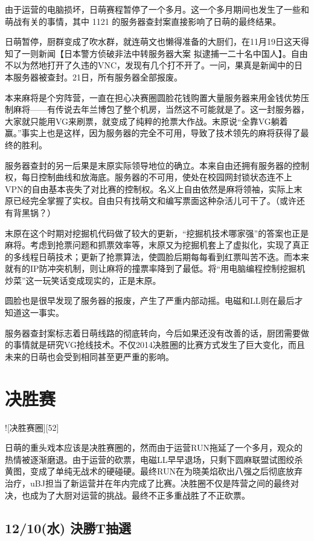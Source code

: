 由于运营的电脑损坏，日萌赛程暂停了一个多月。这一个多月期间也发生了一些和萌战有关的事情，其中 1121 的服务器查封案直接影响了日萌的最终结果。

日萌暂停，厨群变成了吹水群，就连萌文也懒得准备的大厨们，在11月19日这天得知了一则新闻【日本警方侦破非法中转服务器大案 拟逮捕一二十名中国人】。自由不以为然地打开了久违的VNC，发现有几个打不开了。一问，果真是新闻中的日本服务器被查封。21日，所有服务器全部报废。

本来麻将是个穷阵营，一直在担心决赛圈圆脸花钱购置大量服务器来用金钱优势压制麻将——有传说去年兰博包了整个机房，当然这不可能就是了。这一封服务器，大家就只能用VG来刷票，就变成了纯粹的抢票大作战。末原说“全靠VG躺着赢。”事实上也是这样，因为服务器的完全不可用，导致了技术领先的麻将获得了最终的胜利。

服务器查封的另一后果是末原实际领导地位的确立。本来自由还拥有服务器的控制权，每日控制曲线和放海底。服务器的不可用，使处在校园网封锁状态连不上VPN的自由基本丧失了对比赛的控制权。名义上自由依然是麻将领袖，实际上末原已经完全掌握了实权。自由只有找萌文和编写票面这种杂活儿可干了。（或许还有背黑锅？）

末原在这个时期对挖掘机代码做了较大的更新，“挖掘机技术哪家强”的答案也正是麻将。考虑到抢票问题和抓票效率等，末原又为挖掘机套上了虚拟化，实现了真正的多线程日萌技术；更新了抢票算法，使圆脸后期每每看到红票叫苦不迭。而本来就有的IP防冲突机制，则让麻将的撞票率降到了最低。将“用电脑编程控制挖掘机炒菜”这一玩笑话变成现实的，正是末原。

圆脸也是很早发现了服务器的报废，产生了严重内部动摇。电磁和LL则在最后才知道这一事实。

服务器查封案标志着日萌线路的彻底转向，今后如果还没有改善的话，厨团需要做的事情就是研究VG抢线技术。不仅2014决胜圈的比赛方式发生了巨大变化，而且未来的日萌也会受到相同甚至更严重的影响。

\section{决胜赛}

![决胜赛圈][52]

日萌的重头戏本应该是决胜赛圈的，然而由于运营RUN拖延了一个多月，观众的热情被逐渐磨退。由于运营的砍票，电磁LL早早退场，只剩下圆麻联盟试图绞杀黄图，变成了单纯无战术的硬碰硬。最终RUN在为晓美焰砍出八强之后彻底放弃治疗，uBJ担当了新运营并在年内完成了比赛。决胜圈不仅是阵营之间的最终对决，也成为了大厨对运营的挑战。最终不正多重战胜了不正砍票。

\subsection{12/10(水) 決勝T抽選}

